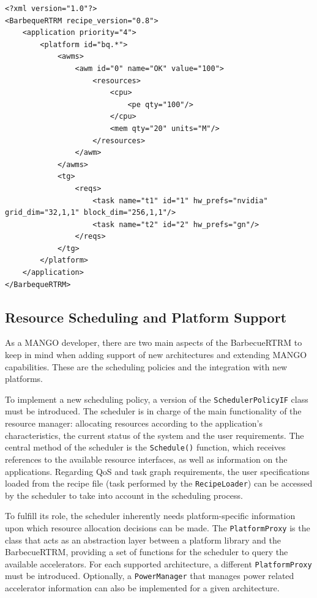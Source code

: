 \begin{lstlisting}[style=CStyle, label=bbque:recipe_example, caption=BarbecueRTRM Recipe file - Saxpy Sample in GN and Nvidia]
<?xml version="1.0"?>
<BarbequeRTRM recipe_version="0.8">
	<application priority="4">
		<platform id="bq.*">
			<awms>
				<awm id="0" name="OK" value="100">
					<resources>
						<cpu>
							<pe qty="100"/>
						</cpu>
						<mem qty="20" units="M"/>
					</resources>
				</awm>
			</awms>
			<tg>
				<reqs>
					<task name="t1" id="1" hw_prefs="nvidia" grid_dim="32,1,1" block_dim="256,1,1"/>
					<task name="t2" id="2" hw_prefs="gn"/>
				</reqs>
			</tg>
		</platform>
	</application>
</BarbequeRTRM>
\end{lstlisting}

\subsection{Resource Scheduling and Platform Support}

As a MANGO developer, there are two main aspects of the BarbecueRTRM to keep in mind when adding support of new architectures and extending MANGO capabilities. These are the scheduling policies and the integration with new platforms.

To implement a new scheduling policy, a version of the \texttt{SchedulerPolicyIF} class must be introduced. The scheduler is in charge of the main functionality of the resource manager: allocating resources according to the application's characteristics, the current status of the system and the user requirements. 
The central method of the scheduler is the \texttt{Schedule()} function, which receives references to the available resource interfaces, as well as information on the applications.
Regarding QoS and task graph requirements, the user specifications loaded from the recipe file (task performed by the \texttt{RecipeLoader}) can be accessed by the scheduler to take into account in the scheduling process.

To fulfill its role, the scheduler inherently needs platform-specific information upon which resource allocation decisions can be made. The \texttt{PlatformProxy} is the class that acts as an abstraction layer between a platform library and the BarbecueRTRM, providing a set of functions for the scheduler to query the available accelerators. For each supported architecture, a different \texttt{PlatformProxy} must be introduced. Optionally, a \texttt{PowerManager} that manages power related accelerator information can also be implemented for a given architecture.

